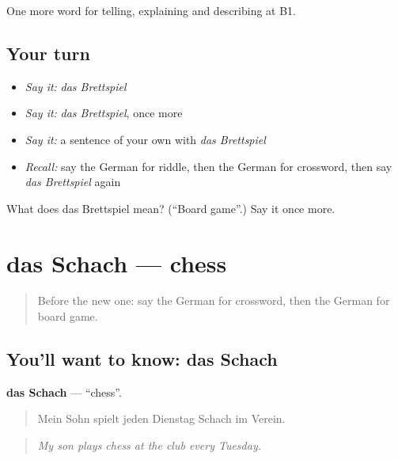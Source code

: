 \begin{grammarlens}[title={What you've built}]
One more word for telling, explaining and describing at B1.
\end{grammarlens}

\subsection*{Your turn}
\begin{itemize}
\raggedright
  \item \emph{Say it:} \emph{das Brettspiel}
  \item \emph{Say it:} \emph{das Brettspiel}, once more
  \item \emph{Say it:} a sentence of your own with \emph{das Brettspiel}
  \item \emph{Recall:} say the German for riddle, then the German for crossword, then say \emph{das Brettspiel} again
\end{itemize}

\begin{tcolorbox}[breakable,colback=teal!4,colframe=teal!35!black,title={Before you move on}]
What does das Brettspiel mean? (\textquotedblleft{}Board game\textquotedblright{}.) Say it once more.
\end{tcolorbox}
\section[das Schach]{das Schach — chess}

\label{lesson:GE-C501-schach}



\begin{quote}
Before the new one: say the German for crossword, then the German for board game.
\end{quote}

\subsection*{You'll want to know: das Schach}
\textbf{das Schach} — \textquotedblleft{}chess\textquotedblright{}.

\begin{quote}
Mein Sohn spielt jeden Dienstag Schach im Verein.
\end{quote}

\begin{quote}
\emph{My son plays chess at the club every Tuesday.}
\end{quote}


